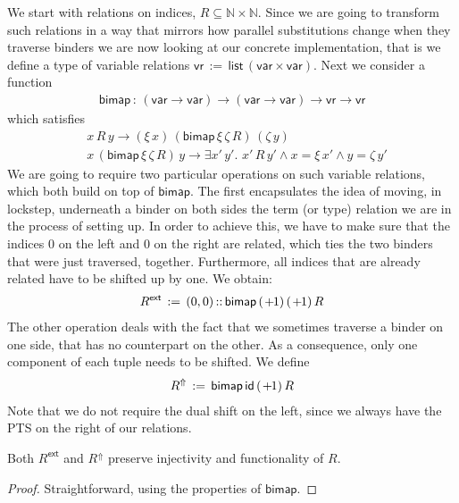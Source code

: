\documentclass[a4paper,UKenglish]{lipics-v2016}
\newcommand{\ms}{\,}
\newcommand{\mrel}[1]{\mathrel{\ms #1 \ms}}
\newcommand{\Nat}{\mathbb{N}}
\newcommand{\OF}{\mrel{:}}
\newcommand{\mEx}[1]{\ensuremath{\exists} #1.\ms\ms}
\newcommand{\eqdef}{\mrel{:=}}
\newcommand{\Rext}[1]{\ensuremath{#1^{\mathsf{ext}}}}
\newcommand{\Rshift}[1]{\ensuremath{#1^{\Uparrow}}}
\newcommand{\id}{\mathsf{id}}
\newcommand{\shift}{\ensuremath{\hspace{0.1em}\mathsf{+}\hspace{0.08em}\!1}}
\begin{document}
We start with relations on indices, $R \subseteq \Nat \times \Nat$.
Since we are going to transform such relations in a way that mirrors how parallel substitutions change when they traverse binders we are now looking at our concrete implementation, that is we define a type of variable relations $\mathsf{vr} \eqdef \mathsf{list}\,(\mathsf{var} \times \mathsf{var})$.
Next we consider a function
\begin{align*}
  \mathsf{bimap} \OF (\mathsf{var} \to \mathsf{var}) \to (\mathsf{var} \to \mathsf{var}) \to \mathsf{vr} \to \mathsf{vr}
\end{align*}
which satisfies
\begin{align*}
  &x\,R\,y \to (\xi\,x)\,(\mathsf{bimap}\,\xi\,\zeta\,R)\,(\zeta\,y)\\
  &x\,(\mathsf{bimap}\,\xi\,\zeta\,R)\,y \to \mEx{x'\,y'} x'\,R\,y' \wedge x = \xi\,x' \wedge y = \zeta\,y'
\end{align*}
We are going to require two particular operations on such variable relations, which both build on top of $\mathsf{bimap}$.
The first encapsulates the idea of moving, in lockstep, underneath a binder on both sides the term (or type) relation we are in the process of setting up.
In order to achieve this, we have to make sure that the indices $0$ on the left and $0$ on the right are related, which ties the two binders that were just traversed, together.
Furthermore, all indices that are already related have to be shifted up by one.
We obtain:
\begin{align*}
  \Rext{R} \eqdef (0,0) \mathop{::} \mathsf{bimap}\,(\shift)\,(\shift)\,R
\end{align*}
The other operation deals with the fact that we sometimes traverse a binder on one side, that has no counterpart on the other.
As a consequence, only one component of each tuple needs to be shifted. We define
\begin{align*}
  \Rshift{R} \eqdef \mathsf{bimap}\,\id\,(\shift)\,R
\end{align*}
Note that we do not require the dual shift on the left, since we always have the PTS on the right of our relations.

\begin{lemma}
  Both $\Rext{R}$ and $\Rshift{R}$ preserve injectivity and functionality of $R$.
\end{lemma}

\begin{proof}
  Straightforward, using the properties of $\mathsf{bimap}$.
\end{proof}
\end{document}
